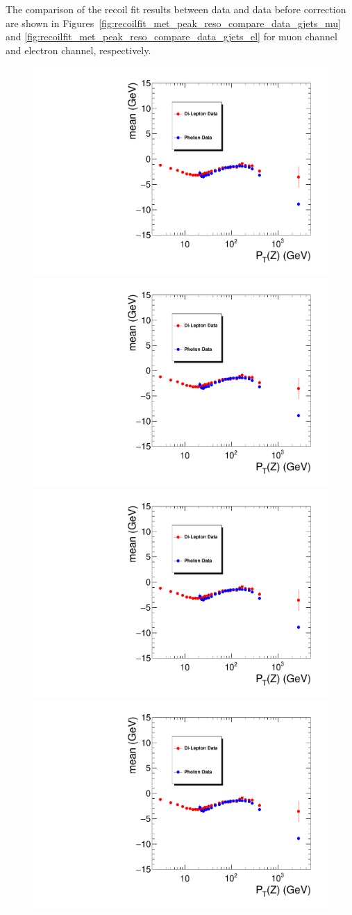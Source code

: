 \vspace{0.3cm}
The comparison of the recoil fit results between \Zjets data and \gjets data before correction are shown in 
Figures~\ref{fig:recoilfit_met_peak_reso_compare_data_gjets_mu}
and \ref{fig:recoilfit_met_peak_reso_compare_data_gjets_el}
for muon channel and electron channel, respectively. 

\begin{figure}[htbp]
\begin{center}
\includegraphics[width=0.46\linewidth, page=1]{figures/plots_SingleEMU_Run2016Full_03Feb2017_allcorV2_met_para_study_ZSelecLowLPt_mu_VS_SinglePhoton_Run2016Full_03Feb2017_allcorV2_NoRecoil_met_para_study_ZSelecLowLPt_mu.pdf}
\includegraphics[width=0.46\linewidth, page=5]{figures/plots_SingleEMU_Run2016Full_03Feb2017_allcorV2_met_para_study_ZSelecLowLPt_mu_VS_SinglePhoton_Run2016Full_03Feb2017_allcorV2_NoRecoil_met_para_study_ZSelecLowLPt_mu.pdf}
\includegraphics[width=0.46\linewidth, page=3]{figures/plots_SingleEMU_Run2016Full_03Feb2017_allcorV2_met_para_study_ZSelecLowLPt_mu_VS_SinglePhoton_Run2016Full_03Feb2017_allcorV2_NoRecoil_met_para_study_ZSelecLowLPt_mu.pdf}
\includegraphics[width=0.46\linewidth, page=7]{figures/plots_SingleEMU_Run2016Full_03Feb2017_allcorV2_met_para_study_ZSelecLowLPt_mu_VS_SinglePhoton_Run2016Full_03Feb2017_allcorV2_NoRecoil_met_para_study_ZSelecLowLPt_mu.pdf}

\end{center}
\end{figure}
